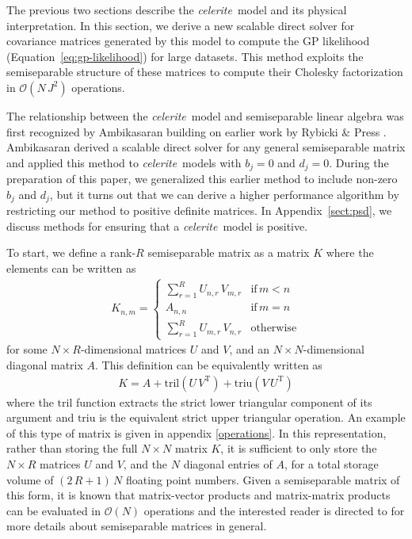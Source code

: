 \documentclass[manuscript, letterpaper]{aastex6}
\newcommand{\celeriteterm}{\emph{celerite}}
\renewcommand{\eqref}[1]{\ref{eq:#1}}
\newcommand{\eqalt}[1]{Equation~\eqref{#1}}
\newcommand{\eqlabel}[1]{\label{eq:#1}}
\newcommand{\sectref}[1]{\ref{sect:#1}}
\newcommand{\App}[1]{Appendix~\sectref{#1}}
\newcommand{\app}[1]{\App{#1}}
\newcommand{\T}{\ensuremath{\mathrm{T}}}
\begin{document}
The previous two sections describe the \celeriteterm\ model and its physical
interpretation.
In this section, we derive a new scalable direct solver for covariance
matrices generated by this model to compute the GP likelihood
(\eqalt{gp-likelihood}) for large datasets.
This method exploits the semiseparable structure of these matrices to compute
their Cholesky factorization in $\mathcal{O}(N\,J^2)$ operations.

The relationship between the \celeriteterm\ model and semiseparable linear
algebra was first recognized by Ambikasaran \citep{Ambikasaran:2015} building
on earlier work by Rybicki \& Press \citep{Rybicki:1995}.
Ambikasaran derived a scalable direct solver for any general semiseparable
matrix and applied this method to \celeriteterm\ models with $b_j = 0$ and
$d_j = 0$.
During the preparation of this paper, we generalized this earlier method to
include non-zero $b_j$ and $d_j$, but it turns out that we can derive a higher
performance algorithm by restricting our method to positive definite matrices.
In \app{psd}, we discuss methods for ensuring that a \celeriteterm\ model is
positive.

To start, we define a rank-$R$ semiseparable matrix as a matrix $K$ where the
elements can be written as
\begin{eqnarray}
K_{n,m} = \left\{\begin{array}{ll}
    \sum_{r=1}^R U_{n,r}\,V_{m,r} & \mathrm{if}\,m<n \\
    A_{n,n} & \mathrm{if}\,m=n \\
    \sum_{r=1}^R U_{m,r}\,V_{n,r} & \mathrm{otherwise}
\end{array}\right.
\end{eqnarray}
for some $N \times R$-dimensional matrices $U$ and $V$, and an $N \times
N$-dimensional diagonal matrix $A$.
This definition can be equivalently written as
\begin{eqnarray}\eqlabel{semi-sep}
K = A + \mathrm{tril}(U\,V^\T) + \mathrm{triu}(V\,U^\T)
\end{eqnarray}
where the $\mathrm{tril}$ function extracts the strict lower triangular
component of its argument and $\mathrm{triu}$ is the equivalent strict upper
triangular operation.  An example of this type of matrix is given in appendix \ref{operations}.
In this representation, rather than storing the full $N \times N$ matrix $K$,
it is sufficient to only store the $N \times R$ matrices $U$ and $V$, and the
$N$ diagonal entries of $A$, for a total storage volume of $(2\,R+1)\,N$
floating point numbers.
Given a semiseparable matrix of this form, it is known that matrix-vector
products and matrix-matrix products can be evaluated in $\mathcal{O}(N)$
operations and the interested reader is directed to \citet{Vandebril:2007} for
more details about semiseparable matrices in general.
\end{document}
